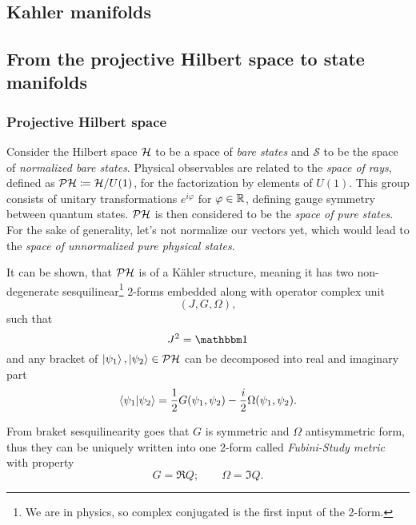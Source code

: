 \chapter{}
\section{Kahler manifolds}

\section{From the projective Hilbert space to state manifolds}

\subsection{Projective Hilbert space}
Consider the Hilbert space $\mathcal{H}$ to be a space of \emph{bare states} and $\mathcal{S}$ to be the space of \emph{normalized bare states}. Physical observables are related to the \emph{space of rays}, defined as $\mathcal{PH}\coloneqq \mathcal{H}/U(1)$, for the factorization by elements of $U(1)$. This group consists of unitary transformations $e^{i\varphi}$ for $\varphi\in\mathbb{R}$, defining gauge symmetry between quantum states. $\mathcal{PH}$ is then considered to be the \emph{space of pure states}. For the sake of generality, let's not normalize our vectors yet, which would lead to the \emph{space of unnormalized pure physical states}. 

It can be shown, that $\mathcal{PH}$ is of a K\"ahler structure, meaning it has two non-degenerate sesquilinear\footnote{We are in physics, so complex conjugated is the first input of the 2-form.} 2-forms embedded along with operator complex unit
$$(J, G, \Omega),$$
such that
\begin{equation}
    J^2=\Id
\end{equation}
and any bracket of $\ket{\psi_1},\ket{\psi_2}\in \mathcal{PH}$ can be decomposed into real and imaginary part\citep{ashtekar_geometrical_1997}
\begin{equation}
    \braket{\psi_1|\psi_2}=\frac{1}{2}G(\psi_1,\psi_2)-\frac{i}{2}\Omega(\psi_1,\psi_2).
    \label{eq:quantumProd}
\end{equation}

From braket sesquilinearity goes that $G$ is symmetric and $\Omega$ antisymmetric form, thus they can be uniquely written into one 2-form called \emph{Fubini-Study metric} with property
\begin{equation}
    G=\Re Q ;\qquad \Omega=\Im Q.
\end{equation}

